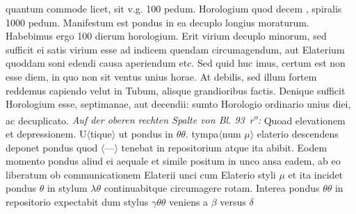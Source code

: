 quantum commode licet, sit v.g. 100 pedum.
Horologium\protect{} quod decem
,
spiralis 1000 pedum. Manifestum est pondus\protect{} in ea
decuplo longius moraturum. Habebimus ergo 100 dierum
horologium\protect{}.
Erit 
virium decuplo minorum, sed sufficit
ei satis virium esse ad indicem quendam circumagendum,
aut Elaterium\protect{}
quoddam soni edendi causa aperiendum etc.
\pend
\count{}
\pstart
Sed quid huc imus, certum est non esse diem, in quo
non sit ventus\protect{} unius horae. At debilis, sed illum fortem
reddemus capiendo velut in Tubum, alisque\protect{} grandioribus
factis. Denique sufficit Horologium esse, septimanae,
aut decendii: sumto Horologio ordinario\protect{} unius diei, ac
decuplicato.
\pend
\vspace{2em}
\pstart
\noindent
\textit{Auf der oberen rechten Spalte von Bl. 93~r\textsuperscript{o}:}
\pend
\vspace{0.5em}
\pstart
\noindent
Quoad elevationem et depressionem. U$\displaystyle\langle$tique$\displaystyle\rangle$
ut pondus\protect{} in $\displaystyle \theta\theta$.
tympa$\displaystyle\langle$num $\displaystyle \mu \rangle$
elaterio\protect{} descendens deponet pondus quod $\displaystyle\langle$---$\displaystyle\rangle$
  tenebat in repositorium 
   atque ita abibit.
Eodem momento pondus aliud ei aequale et simile
positum in unco 
 ansa eadem, ab eo liberatum
ob communicationem Elaterii unci cum Elaterio\protect{}
styli $\displaystyle \mu$ 
et ita incidet pondus $\displaystyle \theta$ in stylum $\displaystyle \lambda\theta$
continuabitque circumagere rotam.\protect{} Interea pondus
$\displaystyle \theta\theta$ in repositorio 
 expectabit dum stylus $\displaystyle \gamma\theta\theta$ 
veniens a $\displaystyle \beta$ versus $\displaystyle \delta$
